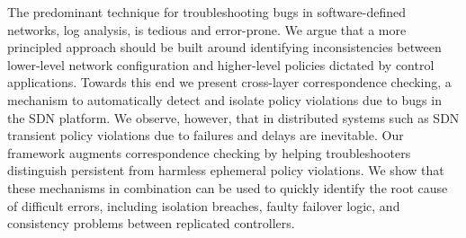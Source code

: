 The predominant technique for troubleshooting bugs in software-defined networks,
log analysis, is tedious and error-prone. We argue that a more principled
approach should be built around identifying inconsistencies between lower-level
network configuration and higher-level policies dictated by control
applications. Towards this end we present
cross-layer correspondence checking, a mechanism to automatically detect and
isolate policy violations due to bugs in the SDN platform. We observe,
however, that in
distributed systems such as SDN 
transient policy violations due to failures and delays are inevitable.
Our \simulator{} framework augments correspondence checking by helping troubleshooters
distinguish persistent from harmless ephemeral policy violations.
We show that these mechanisms in combination can be used to quickly
identify the root cause of difficult errors, including isolation breaches,
faulty failover logic, and consistency problems between replicated
controllers.

